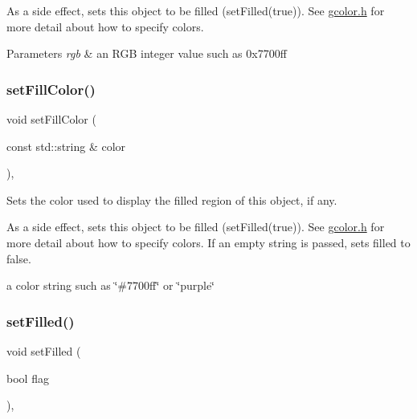 As a side effect, sets this object to be filled (set\+Filled(true)). See \mbox{\hyperlink{gcolor_8h_source}{gcolor.\+h}} for more detail about how to specify colors.


\begin{DoxyParams}{Parameters}
{\em rgb} & an R\+GB integer value such as 0x7700ff \\
\hline
\end{DoxyParams}
\mbox{\label{classGObject_adbc18b1a930aadd97d7437f9f7265b96}} 
\subsubsection{\texorpdfstring{set\+Fill\+Color()}{setFillColor()}\hspace{0.1cm}{\footnotesize\ttfamily [3/3]}}
{\footnotesize\ttfamily void set\+Fill\+Color (\begin{DoxyParamCaption}\item[{const std\+::string \&}]{color }\end{DoxyParamCaption})\hspace{0.3cm}{\ttfamily [virtual]}, {\ttfamily [inherited]}}



Sets the color used to display the filled region of this object, if any. 

As a side effect, sets this object to be filled (set\+Filled(true)). See \mbox{\hyperlink{gcolor_8h_source}{gcolor.\+h}} for more detail about how to specify colors. If an empty string is passed, sets filled to false.

a color string such as \char`\"{}\#7700ff\char`\"{} or \char`\"{}purple\char`\"{} \mbox{\label{classGObject_a9b82b53362282c6bb7d6947068d2e55b}} 
\subsubsection{\texorpdfstring{set\+Filled()}{setFilled()}}
{\footnotesize\ttfamily void set\+Filled (\begin{DoxyParamCaption}\item[{bool}]{flag }\end{DoxyParamCaption})\hspace{0.3cm}{\ttfamily [virtual]}, {\ttfamily [inherited]}}



